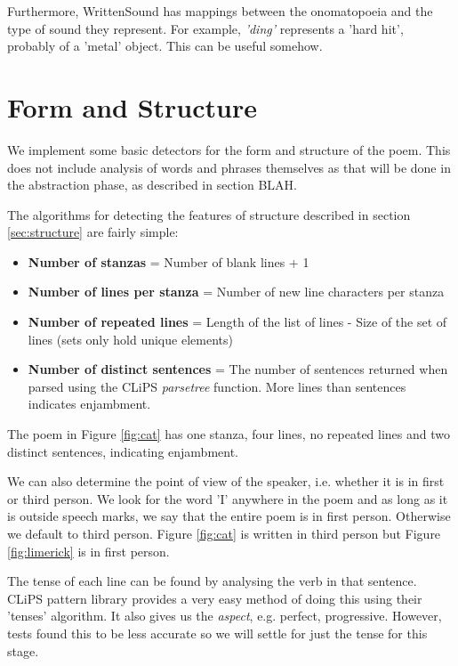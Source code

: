 Furthermore, WrittenSound has mappings between the onomatopoeia and the type of sound they represent. For example, \textit{'ding'} represents a 'hard hit', probably of a 'metal' object. This can be useful somehow.


\section{Form and Structure}

We implement some basic detectors for the form and structure of the poem. This does not include analysis of words and phrases themselves as that will be done in the abstraction phase, as described in section BLAH.

The algorithms for detecting the features of structure described in section \ref{sec:structure} are fairly simple:

\begin{itemize}
\item{\textbf{Number of stanzas} = Number of blank lines + 1}
\item{\textbf{Number of lines per stanza} = Number of new line characters per stanza}
\item{\textbf{Number of repeated lines} = Length of the list of lines - Size of the set of lines (sets only hold unique elements)}
\item{\textbf{Number of distinct sentences} = The number of sentences returned when parsed using the CLiPS \textit{parsetree} function. More lines than sentences indicates enjambment.}
\end{itemize}

The poem in Figure \ref{fig:cat} has one stanza, four lines, no repeated lines and two distinct sentences, indicating enjambment.

We can also determine the point of view of the speaker, i.e. whether it is in first or third person. We look for the word 'I' anywhere in the poem and as long as it is outside speech marks, we say that the entire poem is in first person. Otherwise we default to third person. Figure \ref{fig:cat} is written in third person but Figure \ref{fig:limerick} is in first person.

The tense of each line can be found by analysing the verb in that sentence. CLiPS pattern library provides a very easy method of doing this using their 'tenses' algorithm. It also gives us the \textit{aspect}, e.g. perfect, progressive. However, tests found this to be less accurate so we will settle for just the tense for this stage.

